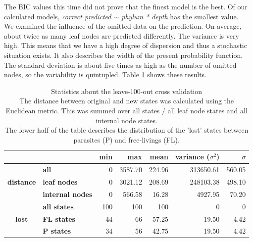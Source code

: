       The BIC values this time did not prove that the finest model is the best. Of our calculated models, 
       \textit{correct predicted $\sim$ phylum * depth} has the smallest value. \\

      We examined the influence of the omitted data on the prediction. On average, about twice as many 
        leaf nodes are predicted differently. \color{red}The variance is very high. This means that 
        we have a high degree of dispersion and thus a stochastic situation exists. It also describes 
        the width of the present probability function. The standard deviation is about five times as 
        high as the number of omitted nodes, so the variability is quintupled. \color{black} Table 
        \ref{table:statistics cross validation} shows these results. \\
      \begin{table}[h!]
        \begin{center}
          \begin{tabular}{ |cl||r|r|r|r|r| }
            \hline
            & & \bfseries min & \bfseries max & \bfseries mean & \bfseries variance ($\sigma^2$) & $\sigma$ \\
            \hline \hline
            \multirow{3}{*}{\bfseries distance} & \bfseries all     & 0 & 3587.70 & 224.96 & 313650.61 & 560.05 \\
            & \bfseries leaf nodes                                  & 0 & 3021.12 & 208.69 & 248103.38 & 498.10 \\
            & \bfseries internal nodes                              & 0 & 566.58 & 16.28 & 4927.95 & 70.20 \\ \hline
            \multirow{3}{*}{\bfseries lost} & \bfseries all states  & 100 & 100 & 100 & 0 & 0 \\
            & \bfseries FL states                                   & 44 & 66 & 57.25 & 19.50 & 4.42 \\
            & \bfseries P states                                    & 34 & 56 & 42.75 & 19.50 & 4.42 \\
            \hline
          \end{tabular}
        \end{center}
        \caption{Statistics about the leave-100-out cross validation \\
          The distance between original and new states was calculated using the Euclidean metric. This 
            was summed over all states / all leaf node states and all internal node states. \\
          The lower half of the table describes the distribution of the 'lost' states between parasites 
            (P) and free-livings (FL).}
        \label{table:statistics cross validation}
      \end{table}


